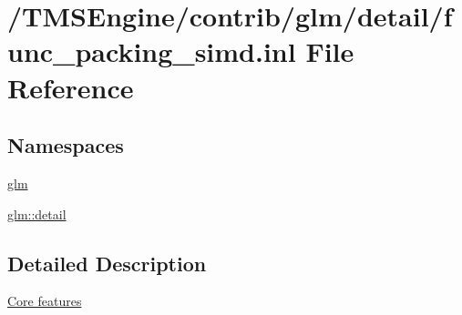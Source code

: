 \hypertarget{func__packing__simd_8inl}{}\section{/\+T\+M\+S\+Engine/contrib/glm/detail/func\+\_\+packing\+\_\+simd.inl File Reference}
\label{func__packing__simd_8inl}
\subsection*{Namespaces}
\begin{DoxyCompactItemize}
\item 
 \hyperlink{namespaceglm}{glm}
\item 
 \hyperlink{namespaceglm_1_1detail}{glm\+::detail}
\end{DoxyCompactItemize}


\subsection{Detailed Description}
\hyperlink{group__core}{Core features} 
